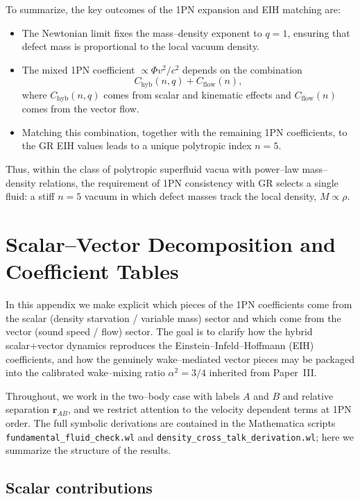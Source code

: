 \documentclass[11pt]{article}
\begin{document}
To summarize, the key outcomes of the 1PN expansion and EIH matching are:
\begin{itemize}
  \item The Newtonian limit fixes the mass--density exponent to
        \(q = 1\), ensuring that defect mass is proportional to the
        local vacuum density.
  \item The mixed 1PN coefficient \(\propto \Phi v^2/c^2\) depends on the
        combination
        \[
          C_{\text{hyb}}(n,q) + C_{\text{flow}}(n),
        \]
        where \(C_{\text{hyb}}(n,q)\) comes from scalar and kinematic
        effects and \(C_{\text{flow}}(n)\) comes from the vector flow.
  \item Matching this combination, together with the remaining 1PN
        coefficients, to the GR EIH values leads to a unique polytropic
        index \(n = 5\).
\end{itemize}
Thus, within the class of polytropic superfluid vacua with power--law
mass--density relations, the requirement of 1PN consistency with GR
selects a single fluid: a stiff \(n=5\) vacuum in which defect masses
track the local density, \(M \propto \rho\).

\section{Scalar--Vector Decomposition and Coefficient Tables}
\label{app:scalar_vector}

In this appendix we make explicit which pieces of the 1PN coefficients come
from the scalar (density starvation / variable mass) sector and which come
from the vector (sound speed / flow) sector.  The goal is to clarify how the
hybrid scalar+vector dynamics reproduces the Einstein--Infeld--Hoffmann
(EIH) coefficients, and how the genuinely wake--mediated vector pieces may be
packaged into the calibrated wake--mixing ratio \(\alpha^2=3/4\) inherited
from Paper~III.

Throughout, we work in the two--body case with labels \(A\) and \(B\) and
relative separation \(\mathbf{r}_{AB}\), and we restrict attention to the
velocity dependent terms at 1PN order.  The full symbolic derivations are
contained in the Mathematica scripts
\texttt{fundamental\_fluid\_check.wl} and
\texttt{density\_cross\_talk\_derivation.wl}; here we summarize the
structure of the results.

\subsection{Scalar contributions}
\label{app:scalar-contributions}
\end{document}
